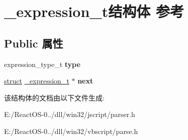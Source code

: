 \hypertarget{struct__expression__t}{}\section{\+\_\+expression\+\_\+t结构体 参考}
\label{struct__expression__t}
\subsection*{Public 属性}
\begin{DoxyCompactItemize}
\item 
\mbox{\label{struct__expression__t_a2e6c87da4f9a3e0b429e1d85fa68a0c0}} 
expression\+\_\+type\+\_\+t {\bfseries type}
\item 
\mbox{\label{struct__expression__t_a774f217b1ffc5014416029856f00ac9b}} 
\hyperlink{interfacestruct}{struct} \hyperlink{struct__expression__t}{\+\_\+expression\+\_\+t} $\ast$ {\bfseries next}
\end{DoxyCompactItemize}


该结构体的文档由以下文件生成\+:\begin{DoxyCompactItemize}
\item 
E\+:/\+React\+O\+S-\/0../dll/win32/jscript/parser.\+h\item 
E\+:/\+React\+O\+S-\/0../dll/win32/vbscript/parse.\+h\end{DoxyCompactItemize}
